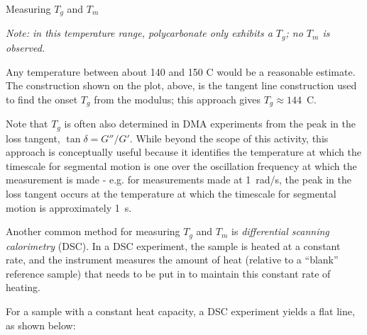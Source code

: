 \begin{activity}{Measuring $T_g$ and $T_m$}
\begin{ctqs}
		\emph{Note: in this temperature range, polycarbonate only exhibits a $T_g$; no $T_m$ is observed.}
		
		\begin{solution}[1in]{}
			Any temperature between about 140 and 150 C would be a reasonable estimate.  The construction shown on the plot, above, is the tangent line construction used to find the onset $T_g$ from the modulus; this approach gives $T_g \approx 144$~C.
			
			Note that $T_g$ is often also determined in DMA experiments from the peak in the loss tangent, $\tan\delta = G''/G'$. While beyond the scope of this activity, this approach is conceptually useful because it identifies the temperature at which the timescale for segmental motion is one over the oscillation frequency at which the measurement is made - e.g. for measurements made at 1~rad/s, the peak in the loss tangent occurs at the temperature at which the timescale for segmental motion is approximately 1~s.
		\end{solution}
	
\end{ctqs}

	
	



\begin{model}
	
	Another common method for measuring $T_g$ and $T_m$ is \emph{differential scanning calorimetry} (DSC).  In a DSC experiment, the sample is heated at a constant rate, and the instrument measures the amount of heat (relative to a ``blank'' reference sample) that needs to be put in to maintain this constant rate of heating.
	
	For a sample with a constant heat capacity, a DSC experiment yields a flat line, as shown below:
	

\end{model}
\end{activity}
